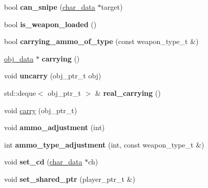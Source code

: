 \begin{DoxyCompactItemize}
bool {\bfseries can\+\_\+snipe} (\hyperlink{structchar__data}{char\+\_\+data} $\ast$target)
\item 
\mbox{\label{classmods_1_1player_ac61916af7f7983f789be3da07d8eef99}} 
bool {\bfseries is\+\_\+weapon\+\_\+loaded} ()
\item 
\mbox{\label{classmods_1_1player_a34eb82a07bfcf1cda938b295a263b692}} 
bool {\bfseries carrying\+\_\+ammo\+\_\+of\+\_\+type} (const weapon\+\_\+type\+\_\+t \&)
\item 
\mbox{\label{classmods_1_1player_a5500e30cd64d867671b0aeb1513a4dd9}} 
\hyperlink{structobj__data}{obj\+\_\+data} $\ast$ {\bfseries carrying} ()
\item 
\mbox{\label{classmods_1_1player_a29cd4d24ec21d08b01e6e4ea57d056ad}} 
void {\bfseries uncarry} (obj\+\_\+ptr\+\_\+t obj)
\item 
\mbox{\label{classmods_1_1player_a8f095a914b197c84ca48daa6f027d63f}} 
std\+::deque$<$ obj\+\_\+ptr\+\_\+t $>$ \& {\bfseries real\+\_\+carrying} ()
\item 
void \hyperlink{classmods_1_1player_a3dfd0e5a7bb17c98cfa5031b02620cbb}{carry} (obj\+\_\+ptr\+\_\+t)
\item 
\mbox{\label{classmods_1_1player_a24f37b27f2a8e2265c825b92dc9126f7}} 
void {\bfseries ammo\+\_\+adjustment} (int)
\item 
\mbox{\label{classmods_1_1player_a505508f9f4abf3d019137f56529cee2e}} 
int {\bfseries ammo\+\_\+type\+\_\+adjustment} (int, const weapon\+\_\+type\+\_\+t \&)
\item 
\mbox{\label{classmods_1_1player_a706d5f48fe7b8e3f3013e8a4e89026ea}} 
void {\bfseries set\+\_\+cd} (\hyperlink{structchar__data}{char\+\_\+data} $\ast$ch)
\item 
\mbox{\label{classmods_1_1player_a6c51e26561ea4c876295da2d3702b724}} 
void {\bfseries set\+\_\+shared\+\_\+ptr} (player\+\_\+ptr\+\_\+t \&)
\item 
\mbox{\label{classmods_1_1player_a09754f81fd228f379ab56861aab2417b}} 

\end{DoxyCompactItemize}
